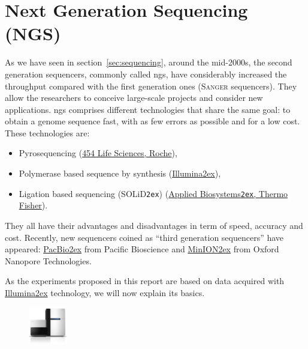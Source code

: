\section{Next Generation Sequencing (NGS)}
\label{sec:ngs}
As we have seen in section~\ref{sec:sequencing}, around the mid-2000s, the second generation sequencers, commonly called \gls{ngs}, have considerably increased the throughput compared with the first generation ones (\textsc{Sanger} sequencers). They allow the researchers to conceive large-scale projects and consider new applications.
\gls{ngs} comprises different technologies that share the same goal: to obtain a genome sequence fast, with as few errors as possible and for a low cost.
These technologies are:

\begin{itemize}
    \item Pyrosequencing (\href{http://www.454.com/}{454 Life Sciences, Roche}),
    \item Polymerase based sequence by synthesis (\href{http://www.illumina.com/}{Illumina\ttfamily\tiny\raise 2ex\hbox{\textregistered}}),
    \item Ligation based sequencing (SOLiD\texttt{\tiny\raise 2ex\hbox{\texttrademark}}) (\href{http://www.appliedbiosystems.com/absite/us/en/home.html}{Applied Biosystems\texttt{\tiny\raise 2ex\hbox{\texttrademark}}, Thermo Fisher}).
\end{itemize}

They all have their advantages and disadvantages in term of speed, accuracy and cost.
Recently, new sequencers coined as ``third generation sequencers'' have appeared:
\href{http://www.pacificbiosciences.com/}{PacBio\ttfamily\tiny\raise 2ex\hbox{\textregistered}} from Pacific Bioscience and \href{https://nanoporetech.com/products-services/minion-mki}{MinION\ttfamily\tiny\raise 2ex\hbox{\texttrademark}} from Oxford Nanopore Technologies.

As the experiments proposed in this report are based on data acquired with \href{http://www.illumina.com/}{Illumina\ttfamily\tiny\raise 2ex\hbox{\textregistered}} technology, we will now explain its basics.

\begin{figure}
    \vspace{-1.9em}
    \includegraphics[width=0.15\textwidth]{img/illumina}
\end{figure}

